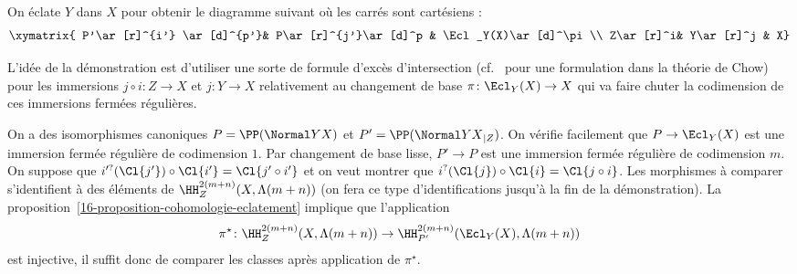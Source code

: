 \documentclass[10pt]{../fichiers-configuration-latex/smfart}
\begin{document}
On éclate $Y$ dans $X$ pour obtenir le diagramme suivant où les carrés sont
cartésiens :
\[
\xymatrix{
P'\ar[r]^{i'} \ar[d]^{p'}& P\ar[r]^{j'}\ar[d]^p & \Ecl_Y(X)\ar[d]^\pi \\
Z\ar[r]^i& Y\ar[r]^j & X}
\]

L'idée de la démonstration est d'utiliser une sorte de formule d'excès
d'intersection (cf.~\cite[theorem~6.3]{IT@Fulton} pour une formulation dans la
théorie de Chow) pour les immersions $j\circ i\colon Z\to X$ et $j\colon Y
\to X$ relativement au changement de base $\pi\colon \Ecl_Y(X)
\to X$ qui va faire
chuter la codimension de ces immersions fermées régulières.

On a des isomorphismes canoniques $P=\PP(\Normal Y X)$ et $P'=\PP({\Normal
Y X}_{|Z})$.
On vérifie facilement que $P\to \Ecl_Y(X)$ est une 
immersion fermée régulière de
codimension $1$. Par changement de base lisse, $P'\to P$ est une immersion
fermée régulière de codimension $m$. On suppose que $i'^?(\Cl {j'})\circ
\Cl {i'}=\Cl{j'\circ i'}$ et on veut montrer que $i^?(\Cl {j})\circ
\Cl {i}=\Cl{j\circ i}$. Les morphismes à comparer s'identifient à des
éléments de $\HH^{2(m+n)}_Z(X,\Lambda(m+n))$ (on fera ce type
d'identifications jusqu'à la fin de la démonstration). La
proposition~\ref{16-proposition-cohomologie-eclatement} implique que
l'application
\[\pi^\star\colon \HH^{2(m+n)}_Z(X,\Lambda(m+n))\to
\HH^{2(m+n)}_{P'}(\Ecl_Y(X),\Lambda(m+n))\]
est injective, il suffit donc de comparer les classes après application de
$\pi^\star$.
\end{document}
